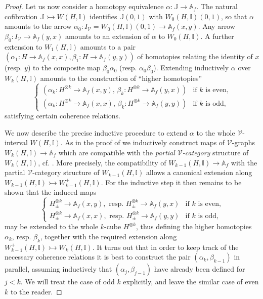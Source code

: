 \documentclass[10pt]{amsart}
\theoremstyle{plain}
\theoremstyle{remark}
\def\Vv{\mathcal{V}}
\def\Iso{\mathbb{I}}
\def\JJ{\mathbb{J}}
\def\ito{\rightarrowtail}
\def\AA{\mathbb{A}}
\begin{document}
\begin{proof}
Let us now consider a homotopy equivalence $\alpha:\JJ\to\AA_f$. The natural cofibration $\JJ\ito W(H,\Iso)$ identifies $\JJ(0,1)$ with $W_0(H,\Iso)(0,1)$, so that $\alpha$ amounts to the arrow $\alpha_0:I_\Vv=W_0(H,\Iso)(0,1)\to\AA_f(x,y)$. Any arrow $\beta_0:I_\Vv\to\AA_f(y,x)$ amounts to an extension of $\alpha$ to $W_0(H,\Iso)$. A further extension to $W_1(H,\Iso)$ amounts to a pair $(\alpha_1:H\to\AA_f(x,x),\beta_1:H\to\AA_f(y,y))$ of homotopies relating the identity of $x$ (resp. $y$) to the composite map $\beta_0\alpha_0$ (resp. $\alpha_0\beta_0$). Extending inductively $\alpha$ over $W_k(H,\Iso)$ amounts to the construction of ``higher homotopies'' $$\begin{cases}(\alpha_k:H^{\otimes k}\to\AA_f(x,y),\,\beta_k:H^{\otimes k}\to\AA_f(y,x))&\text{if }k\text{ is even,}\\(\alpha_k:H^{\otimes k}\to\AA_f(x,x),\,\beta_k:H^{\otimes k}\to\AA_f(y,y))&\text{if }k\text{ is odd,}\end{cases}$$satisfying certain coherence relations.

We now describe the precise inductive procedure to extend $\alpha$ to the whole $\Vv$-interval $W(H,\Iso)$. As in the proof of \cite[Lemma 5.4]{BM1} we inductively construct maps of $\Vv$-graphs $W_k(H,\Iso)\to\AA_f$ which are compatible with the \emph{partial $\Vv$-category} structure of $W_k(H,\Iso)$, cf. \cite[Definition 5.2]{BM1}. More precisely, the compatibility of $W_{k-1}(H,\Iso)\to\AA_f$ with the partial $\Vv$-category structure of $W_{k-1}(H,\Iso)$ allows a canonical extension along $W_{k-1}(H,\Iso)\ito W^+_{k-1}(H,\Iso)$. For the inductive step it then remains to be shown that the induced maps$$\begin{cases}H_\pm^{\otimes k}\to\AA_f(x,y),\text{ resp. }H_\pm^{\otimes k}\to\AA_f(y,x)&\text{if }k\text{ is even,}\\H_\pm^{\otimes k}\to\AA_f(x,x),\text{ resp. }H_\pm^{\otimes k}\to\AA_f(y,y)&\text{if }k\text{ is odd,}\end{cases}$$may be extended to the whole $k$-cube $H^{\otimes k}$, thus defining the higher homotopies $\alpha_k$, resp. $\beta_k$, together with the required extension along $W_{k-1}^+(H,\Iso)\ito W_k(H,\Iso)$. It turns out that in order to keep track of the necessary coherence relations it is best to construct the pair $(\alpha_k,\beta_{k-1})$ in parallel, assuming inductively that $(\alpha_j,\beta_{j-1})$ have already been defined for $j<k$. We will treat the case of odd $k$ explicitly, and leave the similar case of even $k$ to the reader.


\end{proof}
\end{document}
